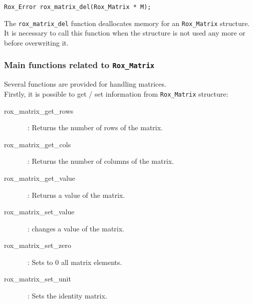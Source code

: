 \begin{lstlisting}
Rox_Error rox_matrix_del(Rox_Matrix * M);
\end{lstlisting}
The \lstinline$rox_matrix_del$ function deallocates memory for an \lstinline$Rox_Matrix$ structure. It is necessary to call this function when the structure is not used any more or before overwriting it.

\subsubsection{Main functions related to {\tt Rox\_Matrix}}
\label{sss:matrix_function}
Several functions are provided for handling matrices. \\

Firstly, it is possible to get / set information from \lstinline$Rox_Matrix$ structure:
\begin{description}
  \item[rox\_matrix\_get\_rows]~: Returns the number of rows of the matrix.
  \item[rox\_matrix\_get\_cols]~: Returns the number of columns of the matrix.
  \item[rox\_matrix\_get\_value]~: Returns a value of the matrix.
  \item[rox\_matrix\_set\_value]~: changes a value of the matrix.
  \item[rox\_matrix\_set\_zero]~: Sets to 0 all matrix elements.
  \item[rox\_matrix\_set\_unit]~: Sets the identity matrix.
\end{description}



